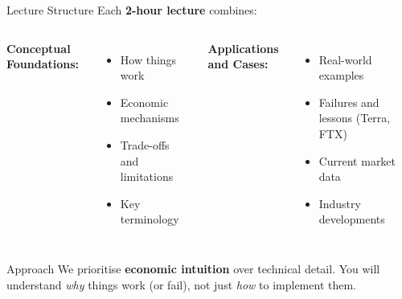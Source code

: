 \documentclass[10pt]{beamer}
\newcommand{\highlight}[1]{\textcolor{AccentOrange}{\textbf{#1}}}
\begin{document}
\begin{frame}{Lecture Structure}
  Each \highlight{2-hour lecture} combines:
  
  \vspace{1em}
  \begin{columns}[T]
    \textbf{Conceptual Foundations:}
    \begin{itemize}
      \item How things work
      \item Economic mechanisms
      \item Trade-offs and limitations
      \item Key terminology
    \end{itemize}
    
    \textbf{Applications and Cases:}
    \begin{itemize}
      \item Real-world examples
      \item Failures and lessons (Terra, FTX)
      \item Current market data
      \item Industry developments
    \end{itemize}
  \end{columns}
  
  \vspace{1.5em}
  \begin{block}{Approach}
    We prioritise \highlight{economic intuition} over technical detail. You will understand \textit{why} things work (or fail), not just \textit{how} to implement them.
  \end{block}
\end{frame}
\end{document}
